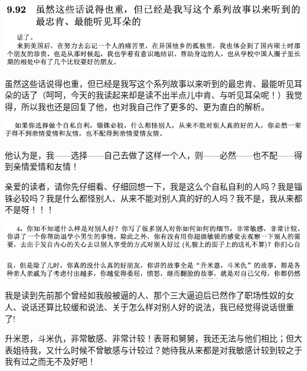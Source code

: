 \documentclass[9pt, b5paper]{article}
\begin{document}
\begin{center}
\includegraphics[width=.9\linewidth]{./pic/backups_plans_20210413_140845.png}
\end{center}

虽然这些话说得也重，但已经是我写这个系列故事以来听到的最忠肯、最能听见耳朵的话了（呵呵，今天的我读起来却是读不出半点儿中肯、与听见耳朵呢！）我觉得，所以我也还是回复了他，也对我自己作了更多的、更为直白的解析。

\begin{center}
\includegraphics[width=.9\linewidth]{./pic/backups_plans_20210413_131134.png}
\end{center}

他认为是，我——选择——自己去做了这样一个人，则——必然——也不配——得到亲情爱情和友情！

亲爱的读者，请你先仔细看、仔细回想一下，我是这么个自私自利的人吗？我是锱铢必较吗？我是什么都怪别人、从来不能对别人真的好的人吗？我不是，我从来都不是呀！！！

\begin{center}
\includegraphics[width=.9\linewidth]{./pic/backups_plans_20210413_142517.png}
\end{center}

\begin{center}
\includegraphics[width=.9\linewidth]{./pic/backups_plans_20210413_143045.png}
\end{center}

我是读到先前那个曾经如我般被逼的人、那个三大逼迫后已然作了职场性奴的女人、说话还算比较缓和说法、关于怎么样对别人好的说法，我已经觉得说话很重了!

升米恩，斗米仇，非常敏感、非常计较！表哥和舅舅，我还无法与他们相比；但大表姐待我，又什么时候不曾敏感与计较过？她待我从来都是对我敏感计较到较之于我有过之而无不及好吧！
\end{document}
